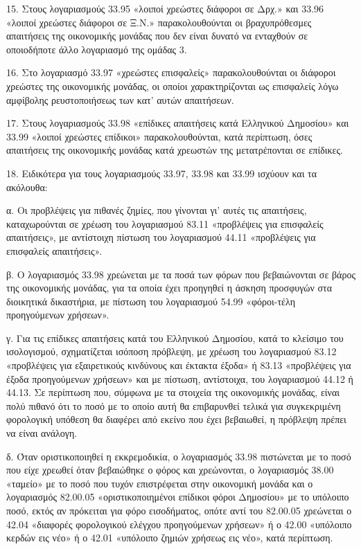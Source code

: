 \documentclass[A4,10pt,greek]{book}
\begin{document}
15. Στους λογαριασμούς 33.95 «λοιποί χρεώστες διάφοροι σε Δρχ.» και 33.96 «λοιποί χρεώστες διάφοροι σε Ξ.Ν.» παρακολουθούνται οι βραχυπρόθεσμες απαιτήσεις της οικονομικής μονάδας που δεν είναι δυνατό να ενταχθούν σε οποιοδήποτε άλλο λογαριασμό της ομάδας 3.

16. Στο λογαριασμό 33.97 «χρεώστες επισφαλείς» παρακολουθούνται οι διάφοροι χρεώστες της οικονομικής μονάδας, οι οποίοι χαρακτηρίζονται ως επισφαλείς λόγω αμφίβολης ρευστοποιήσεως των κατ' αυτών απαιτήσεων.

17. Στους λογαριασμούς 33.98 «επίδικες απαιτήσεις κατά Ελληνικού Δημοσίου» και 33.99 «λοιποί χρεώστες επίδικοι» παρακολουθούνται, κατά περίπτωση, όσες απαιτήσεις της οικονομικής μονάδας κατά χρεωστών της μετατρέπονται σε επίδικες.

18. Ειδικότερα για τους λογαριασμούς 33.97, 33.98 και 33.99 ισχύουν και τα ακόλουθα:

α. Οι προβλέψεις για πιθανές ζημίες, που γίνονται γι' αυτές τις απαιτήσεις, καταχωρούνται σε χρέωση του λογαριασμού 83.11 «προβλέψεις για επισφαλείς απαιτήσεις», με αντίστοιχη πίστωση του λογαριασμού 44.11 «προβλέψεις για επισφαλείς απαιτήσεις».

β. Ο λογαριασμός 33.98 χρεώνεται με τα ποσά των φόρων που βεβαιώνονται σε βάρος της οικονομικής μονάδας, για τα οποία έχει προηγηθεί η άσκηση προσφυγών στα διοικητικά δικαστήρια, με πίστωση του λογαριασμού 54.99 «φόροι-τέλη προηγούμενων χρήσεων».

γ. Για τις επίδικες απαιτήσεις κατά του Ελληνικού Δημοσίου, κατά το κλείσιμο του ισολογισμού, σχηματίζεται ισόποση πρόβλεψη, με χρέωση του λογαριασμού 83.12 «προβλέψεις για εξαιρετικούς κινδύνους και έκτακτα έξοδα» ή 83.13 «προβλέψεις για έξοδα προηγούμενων χρήσεων» και με πίστωση, αντίστοιχα, του λογαριασμού 44.12 ή 44.13. Σε περίπτωση που, σύμφωνα με τα στοιχεία της οικονομικής μονάδας, είναι πολύ πιθανό ότι το ποσό με το οποίο αυτή θα επιβαρυνθεί τελικά για συγκεκριμένη φορολογική υπόθεση θα διαφέρει από εκείνο που έχει βεβαιωθεί, η πρόβλεψη πρέπει να είναι ανάλογη.

δ. Όταν οριστικοποιηθεί η εκκρεμοδικία, ο λογαριασμός 33.98 πιστώνεται με το ποσό που είχε χρεωθεί όταν βεβαιώθηκε ο φόρος και χρεώνονται, ο λογαριασμός 38.00 «ταμείο» με το ποσό που τυχόν επιστρέφεται στην οικονομική μονάδα και ο λογαριασμός 82.00.05 «οριστικοποιημένοι επίδικοι φόροι Δημοσίου» με το υπόλοιπο ποσό, εκτός αν πρόκειται για φόρο εισοδήματος, οπότε αντί του 82.00.05 χρεώνεται ο 42.04 «διαφορές φορολογικού ελέγχου προηγούμενων χρήσεων» ή ο 42.00 «υπόλοιπο κερδών εις νέο» ή ο 42.01 «υπόλοιπο ζημιών χρήσεως εις νέο», κατά περίπτωση.
\end{document}
